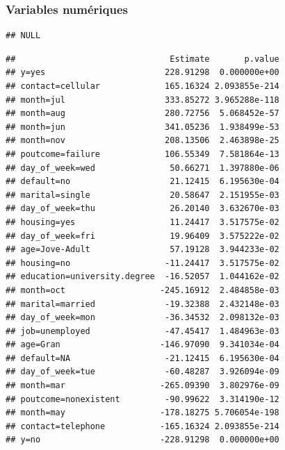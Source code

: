 \documentclass[
]{article}
\newenvironment{Shaded}{\begin{snugshade}}{\end{snugshade}}
\newcommand{\AttributeTok}[1]{\textcolor[rgb]{0.77,0.63,0.00}{#1}}
\newcommand{\CommentTok}[1]{\textcolor[rgb]{0.56,0.35,0.01}{\textit{#1}}}
\newcommand{\FloatTok}[1]{\textcolor[rgb]{0.00,0.00,0.81}{#1}}
\newcommand{\FunctionTok}[1]{\textcolor[rgb]{0.00,0.00,0.00}{#1}}
\newcommand{\NormalTok}[1]{#1}
\newcommand{\OtherTok}[1]{\textcolor[rgb]{0.56,0.35,0.01}{#1}}
\newcommand{\SpecialCharTok}[1]{\textcolor[rgb]{0.00,0.00,0.00}{#1}}
\newcommand{\StringTok}[1]{\textcolor[rgb]{0.31,0.60,0.02}{#1}}
\begin{document}
\hypertarget{variables-numuxe9riques}{%
\subsubsection{Variables numériques}\label{variables-numuxe9riques}}

\begin{Shaded}
\end{Shaded}

\begin{verbatim}
## NULL
\end{verbatim}

\begin{Shaded}
\end{Shaded}

\begin{verbatim}
##                               Estimate       p.value
## y=yes                        228.91298  0.000000e+00
## contact=cellular             165.16324 2.093855e-214
## month=jul                    333.85272 3.965288e-118
## month=aug                    280.72756  5.068452e-57
## month=jun                    341.05236  1.938499e-53
## month=nov                    208.13506  2.463898e-25
## poutcome=failure             106.55349  7.581864e-13
## day_of_week=wed               50.66271  1.397880e-06
## default=no                    21.12415  6.195630e-04
## marital=single                20.58647  2.151955e-03
## day_of_week=thu               26.20140  3.632670e-03
## housing=yes                   11.24417  3.517575e-02
## day_of_week=fri               19.96409  3.575222e-02
## age=Jove-Adult                57.19128  3.944233e-02
## housing=no                   -11.24417  3.517575e-02
## education=university.degree  -16.52057  1.044162e-02
## month=oct                   -245.16912  2.484858e-03
## marital=married              -19.32388  2.432148e-03
## day_of_week=mon              -36.34532  2.098132e-03
## job=unemployed               -47.45417  1.484963e-03
## age=Gran                    -146.97090  9.341034e-04
## default=NA                   -21.12415  6.195630e-04
## day_of_week=tue              -60.48287  3.926094e-09
## month=mar                   -265.09390  3.802976e-09
## poutcome=nonexistent         -90.99622  3.314190e-12
## month=may                   -178.18275 5.706054e-198
## contact=telephone           -165.16324 2.093855e-214
## y=no                        -228.91298  0.000000e+00
\end{verbatim}
\end{document}
